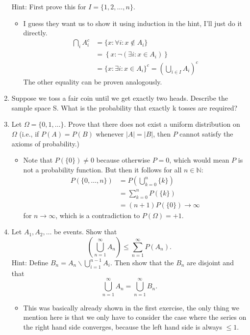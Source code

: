 \documentclass{article}
\begin{document}
\begin{enumerate}
	Hint: First prove this for $I = \{1, 2, \dots, n\}$.
		\begin{itemize}
			\item I guess they want us to show it using induction in the hint, I'll just do it directly.
			$$
			\begin{aligned}
			\bigcap_i A_i^c &= \{x : \forall i : x \notin A_i\} \\
			&= \left\{x : \neg \left( \exists i : x \in A_i \right)\right\} \\
			&= \{x : \exists i : x \in A_i\}^c = \left( \bigcup_{i \in I} A_i \right)^c
			\end{aligned}
			$$
			The other equality can be proven analogously.
		\end{itemize}
	\item Suppose we toss a fair coin until we get exactly two heads. Describe the sample space S. What is the probability that exactly k tosses are required?
	\item Let $\Omega = \{0, 1, \dots \}$. Prove that there does not exist a uniform distribution on $\Omega$ (i.e., if $P(A) = P(B)$ whenever $|A| = |B|$, then $P$ cannot satisfy the axioms of probability.)
		\begin{itemize}
			\item Note that $P(\{0\}) \neq 0$ because otherwise $P = 0$, which would mean $P$ is not a probability function. But then it follows for all $n \in \mathbb{N}$:
			$$
			\begin{aligned}
			P(\{0, \dots, n\}) &= P\left(\bigcup_{k = 0}^n \{k\} \right) \\
			&= \sum_{k = 0}^n P(\{k\}) \\
			&= (n + 1)P(\{0\}) \rightarrow \infty
			\end{aligned}
			$$
			for $n \rightarrow \infty$, which is a contradiction to $P(\Omega) = +1$.
		\end{itemize}
	\item Let $A_1, A_2, \dots$ be events. Show that
	$$
	\left( \bigcup_{n = 1}^\infty A_n \right) \leq \sum_{n = 1}^\infty P(A_n).
	$$
	Hint: Define $B_n = A_n \backslash \bigcup_{i = 1}^{n - 1} A_i$. Then show that the $B_n$ are disjoint and that
	$$
	\bigcup_{n = 1}^\infty A_n = \bigcup_{n = 1}^\infty B_n.
	$$
	\begin{itemize}
		\item This was basically already shown in the first exercise, the only thing we mention here is that we only have to consider the case where the series on the right hand side converges, because the left hand side is always $\leq 1$.

\end{itemize}
\end{enumerate}
\end{document}
